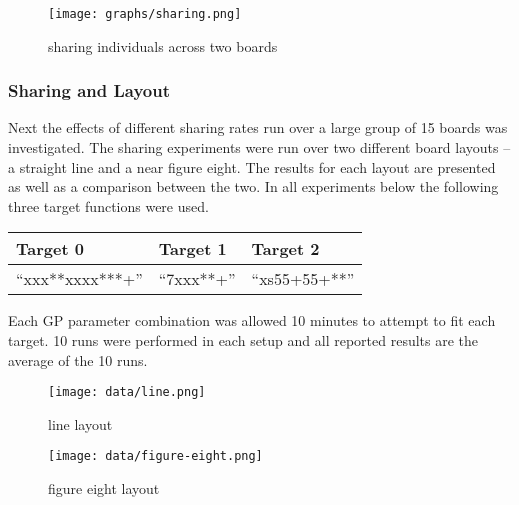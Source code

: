 \documentclass[11pt]{article}
\begin{document}
\begin{figure}[htb]
\centering
\texttt{[image: graphs/sharing.png]}
\caption{sharing individuals across two boards}
\end{figure}

\subsubsection*{Sharing and Layout}
\label{sec-1.5.3}

Next the effects of different sharing rates run over a large group of
15 boards was investigated.  The sharing experiments were run over two
different board layouts -- a straight line and a near figure eight.
The results for each layout are presented as well as a comparison
between the two.  In all experiments below the following three target
functions were used.


\begin{center}
\begin{tabular}{lll}
 Target 0           &  Target 1     &  Target 2        \\
\hline
 ``xxx**xxxx***+''  &  ``7xxx**+''  &  ``xs55+55+**''  \\
\end{tabular}
\end{center}



Each GP parameter combination was allowed 10 minutes to attempt to fit
each target.  10 runs were performed in each setup and all reported
results are the average of the 10 runs.

\begin{figure}[htb]
\centering
\texttt{[image: data/line.png]}
\caption{line layout}
\end{figure}

\begin{figure}[htb]
\centering
\texttt{[image: data/figure-eight.png]}
\caption{figure eight layout}
\end{figure}
\end{document}
